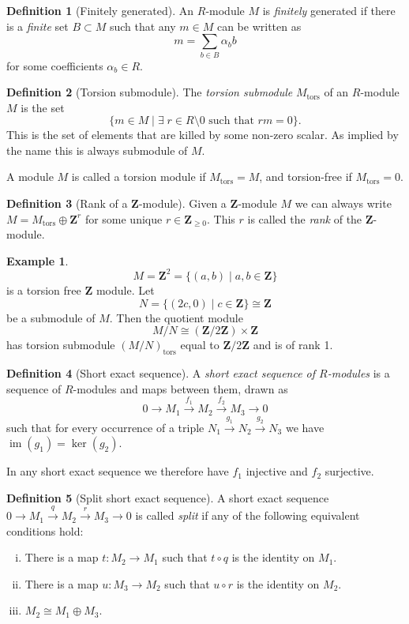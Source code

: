 \documentclass[12pt,a4paper,abstracton,bibtotoc]{scrreprt}
\theoremstyle{definition}
\newtheorem{defn}{Definition}
\newtheorem{ex}{Example}
\newcommand{\ZZ}{\mathbf{Z}}
\DeclareMathOperator{\im}{im}
\begin{document}
\begin{defn}[Finitely generated]
An $R$-module $M$ is \emph{finitely} generated if there is a \emph{finite} set $B\subset M$ such that any $m\in M$ can be written as
\[m = \sum_{b\in B} \alpha_b b\]
for some coefficients $\alpha_b \in R$.
\end{defn}

\begin{defn}[Torsion submodule]
The \emph{torsion submodule} $M_\text{tors}$ of an $R$-module $M$ is the set
\[
\{m\in M \mid \exists\; r \in R\setminus 0 \text{ such that } rm = 0\}.
\]
This is the set of elements that are killed by some non-zero scalar.
As implied by the name this is always submodule of $M$.
\end{defn}

A module $M$ is called a torsion module if $M_\text{tors} = M$, and torsion-free if $M_\text{tors} = 0$.


\begin{defn}[Rank of a $\ZZ$-module]
Given a $\ZZ$-module $M$ we can always write $M = M_\text{tors} \oplus \ZZ^r$ for some unique $r\in \ZZ_{\ge 0}$.
This $r$ is called the \emph{rank} of the $\ZZ$-module.
\end{defn}

\begin{ex}
\[M = \ZZ^2 = \{(a,b)\mid a,b\in \ZZ\}\]
is a torsion free $\ZZ$ module. Let
\[N = \{(2c,0) \mid c\in\ZZ\} \cong \ZZ\]
be a submodule of $M$.
Then the quotient module
\[M/N \cong (\ZZ/2\ZZ)\times \ZZ\]
has torsion submodule $(M/N)_\text{tors}$ equal to $\ZZ/2\ZZ$ and is of rank 1.
\end{ex}

\begin{defn}[Short exact sequence]
A \emph{short exact sequence of $R$-modules} is a sequence of $R$-modules and maps between them, drawn as
\[
0 \to M_1 \xrightarrow{f_1} M_2 \xrightarrow{f_2} M_3 \to 0
\]
such that for every occurrence of a triple $N_1 \xrightarrow{g_1} N_2 \xrightarrow{g_2} N_3$ we have $\im(g_1) = \ker(g_2)$.
\end{defn}

In any short exact sequence we therefore have $f_1$ injective and $f_2$ surjective.

\begin{defn}[Split short exact sequence]
A short exact sequence $0 \to M_1 \xrightarrow{q} M_2 \xrightarrow{r} M_3 \to 0$ is called \emph{split} if any of the following equivalent conditions hold:
\begin{enumerate}[(i)]
\item There is a map $t\colon M_2 \to M_1$ such that $t\circ q$ is the identity on $M_1$.
\item There is a map $u\colon M_3 \to M_2$ such that $u\circ r$ is the identity on $M_2$.
\item $M_2 \cong M_1 \oplus M_3$.
\end{enumerate}
\end{defn}
\end{document}
